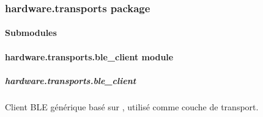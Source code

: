 \documentclass[letterpaper,10pt,french]{sphinxmanual}
\begin{document}
\subsubsection{hardware.transports package}
\label{\detokenize{api/hardware.transports:hardware-transports-package}}\label{\detokenize{api/hardware.transports::doc}}

\paragraph{Submodules}
\label{\detokenize{api/hardware.transports:submodules}}

\paragraph{hardware.transports.ble\_client module}
\label{\detokenize{api/hardware.transports:module-hardware.transports.ble_client}}\label{\detokenize{api/hardware.transports:hardware-transports-ble-client-module}}

\subparagraph{hardware.transports.ble\_client}
\label{\detokenize{api/hardware.transports:hardware-transports-ble-client}}
\sphinxAtStartPar
Client BLE générique basé sur , utilisé comme couche de transport.
\end{document}
